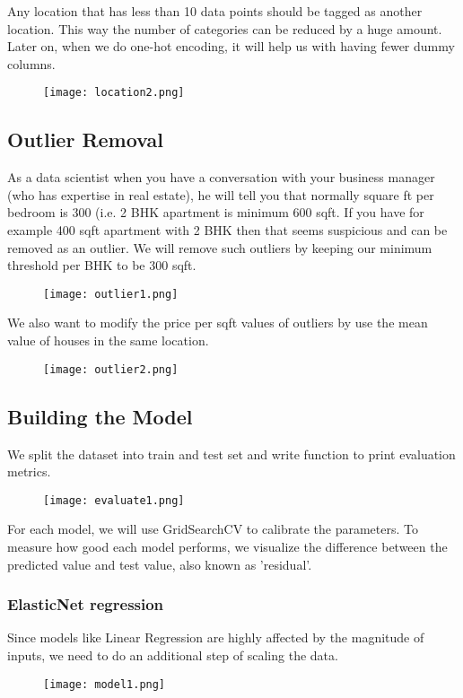 \documentclass[a4paper, 12pt]{article}
\begin{document}
Any location that has less than 10 data points should be tagged as another location. This way the number of categories can be reduced by a huge amount. Later on, when we do one-hot encoding, it will help us with having fewer dummy columns.

\begin{figure}[tbh]
    \centering
    \texttt{[image: location2.png]}
\end{figure}

\subsection{Outlier Removal}
As a data scientist when you have a conversation with your business manager (who has expertise in real estate), he will tell you that normally square ft per bedroom is 300 (i.e. 2 BHK apartment is minimum 600 sqft. If you have for example 400 sqft apartment with 2 BHK then that seems suspicious and can be removed as an outlier. We will remove such outliers by keeping our minimum threshold per BHK to be 300 sqft.


\begin{figure}[tbh]
    \centering
    \texttt{[image: outlier1.png]}
\end{figure}

We also want to modify the price per sqft values of outliers by use the mean value of houses in the same location.

\begin{figure}[tbh]
    \centering
    \texttt{[image: outlier2.png]}
\end{figure}


\subsection{Building the Model} 
We split the dataset into train and test set and write function to print evaluation metrics.

\begin{figure}[tbh]
    \centering
    \texttt{[image: evaluate1.png]}
\end{figure}

For each model, we will use GridSearchCV to calibrate the parameters. To measure how good each model performs, we visualize the difference between the predicted value and test value, also known as 'residual'.

\subsubsection{ElasticNet regression}
Since models like Linear Regression are highly affected by the magnitude of inputs, we need to do an additional step of scaling the data.
\begin{figure}[tbh]
    \centering
    \texttt{[image: model1.png]}
\end{figure}
\end{document}

